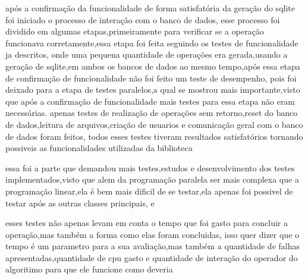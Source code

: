 \documentclass[
	12pt,				%
	openright,			%
	oneside,			%
	a4paper,			%
	english,			%
	french,				%
	spanish,			%
	brazil,				%
	]{abntex2}
\begin{document}
após a confirmação da funcionalidade de forma satisfatória da geração do sqlite foi iniciado o processo de interação com o banco de dados,
esse processo foi dividido em algumas etapas,primeiramente para verificar se a operação funcionava corretamente,essa etapa foi feita seguindo os testes de funcionalidade ja descritos,
onde uma pequena quantidade de operações era gerada,usando a geração de sqlite,em ambos os bancos de dados ao mesmo tempo,após essa etapa de confirmação de funcionalidade não foi feito um teste de desempenho,
pois foi deixado para a etapa de testes paralelos,a qual se mostrou mais importante,visto que após a confirmação de funcionalidade mais testes para essa etapa não eram necessárias.
apenas testes de realização de operações sem retorno,reset do banco de dados,leitura de arquivos,criação de usuarios e comunicação geral com o banco de dados foram feitos,
todos esses testes tiveram resultados satisfatórios tornando possiveis as funcionalidades utilizadas da biblioteca 

essa foi a parte que demandou mais testes,estudos e desenvolvimento dos testes implementados,visto que alem da programação paralela ser mais complexa que a programação linear,ela é bem mais dificil de se testar,ela apenas foi possivel de testar após as outras classes principais, e 

esses testes não apenas levam em conta o tempo que foi gasto para concluir a operação,mas também a forma como elas foram concluidas,
isso quer dizer que o tempo é um parametro para a sua avaliação,mas também a quantidade de falhas apresentadas,quantidade de cpu gasto e quantidade de interação do operador do algoritimo para que ele funcione como deveria
\end{document}
